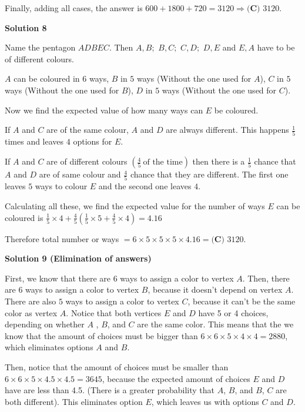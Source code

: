 \begin{enumerate}
 Finally, adding all cases, the answer is $600+1800+720=3120 \Longrightarrow \boxed{\textbf{(C) } 3120}$.

 



\textbf{Solution 8}

Name the pentagon $ADBEC$. Then $A,B;$ $B,C;$ $C,D;$ $D,E$ and $E,A$ have to be of different colours.

 $A$ can be coloured in $6$ ways, $B$ in $5$ ways (Without the one used for $A$), $C$ in $5$ ways (Without the one used for $B$), $D$ in $5$ ways (Without the one used for $C$).

 Now we find the expected value of how many ways can $E$ be coloured. 

 If $A$ and $C$ are of the same colour, $A$ and $D$ are always different. This happens $\frac{1}{5}$ times and leaves $4$ options for $E$.

 If $A$ and $C$ are of different colours $\left(\frac{4}{5} \ \text{of the time} \right)$ then there is a $\frac{1}{5}$ chance that $A$ and $D$ are of same colour and $\frac{4}{5}$ chance that they are different. The first one leaves $5$ ways to colour $E$ and the second one leaves $4$. 

 Calculating all these, we find the expected value for the number of ways $E$ can be coloured is $\frac{1}{5} \times 4 + \frac{4}{5} \left( \frac{1}{5} \times 5 + \frac{4}{5} \times 4 \right) = 4.16$

 Therefore total number or ways $= 6 \times 5 \times 5 \times 5 \times 4.16 = \boxed{\textbf{(C) } 3120}$.

 



\textbf{Solution 9 (Elimination of answers)}

First, we know that there are $6$ ways to assign a color to vertex $A$. Then, there are $6$ ways to assign a color to vertex $B$, because it doesn't depend on vertex $A$. There are also $5$ ways to assign a color to vertex $C$, because it can't be the same color as vertex $A$. Notice that both vertices $E$ and $D$ have 5 or 4 choices, depending on whether $A$ , $B$, and $C$ are the same color. This means that the we know that the amount of choices must be bigger than $6 \times 6 \times 5 \times 4 \times 4 = 2880$, which eliminates options $A$ and $B$. 

 Then, notice that the amount of choices must be smaller than $6 \times 6 \times 5 \times 4.5 \times 4.5 = 3645$, because the expected amount of choices $E$ and $D$ have are less than 4.5. (There is a greater probability that $A$, $B$, and $B$, $C$ are both different). This eliminates option $E$, which leaves us with options $C$ and $D$. 


\end{enumerate}
